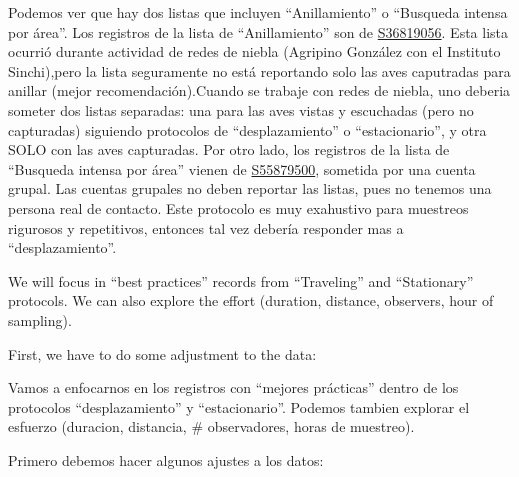 \documentclass[
]{article}
\begin{document}
Podemos ver que hay dos listas que incluyen ``Anillamiento'' o
``Busqueda intensa por área''. Los registros de la lista de
``Anillamiento'' son de
\href{https://ebird.org/checklist/S36819056}{S36819056}. Esta lista
ocurrió durante actividad de redes de niebla (Agripino González con el
Instituto Sinchi),pero la lista seguramente no está reportando solo las
aves caputradas para anillar (mejor recomendación).Cuando se trabaje con
redes de niebla, uno deberia someter dos listas separadas: una para las
aves vistas y escuchadas (pero no capturadas) siguiendo protocolos de
``desplazamiento'' o ``estacionario'', y otra SOLO con las aves
capturadas. Por otro lado, los registros de la lista de ``Busqueda
intensa por área'' vienen de
\href{https://ebird.org/checklist/S55879500}{S55879500}, sometida por
una cuenta grupal. Las cuentas grupales no deben reportar las listas,
pues no tenemos una persona real de contacto. Este protocolo es muy
exahustivo para muestreos rigurosos y repetitivos, entonces tal vez
debería responder mas a ``desplazamiento''.

We will focus in ``best practices'' records from ``Traveling'' and
``Stationary'' protocols. We can also explore the effort (duration,
distance, observers, hour of sampling).

First, we have to do some adjustment to the data:

Vamos a enfocarnos en los registros con ``mejores prácticas'' dentro de
los protocolos ``desplazamiento'' y ``estacionario''. Podemos tambien
explorar el esfuerzo (duracion, distancia, \# observadores, horas de
muestreo).

Primero debemos hacer algunos ajustes a los datos:
\end{document}
